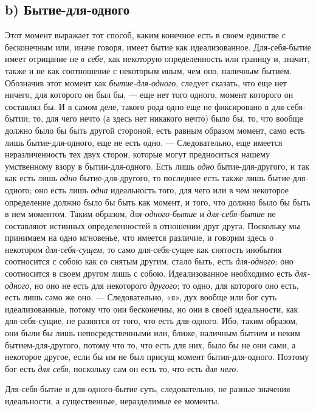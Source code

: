 \subsection*{b) Бытие-для-одного}
Этот момент выражает тот способ, каким конечное есть в своем единстве с
бесконечным или, иначе говоря, имеет бытие как идеализованное.
Для-себя-бытие имеет отрицание не {\em в себе}, как
некоторую определенность или границу и, значит, также и не как соотношение
с некоторым иным, чем оно, наличным бытием. Обозначив этот момент как
{\em бытие-для-одного}, следует сказать, что еще нет
ничего, для которого он был бы, — еще нет того одного, момент которого он
составлял бы. И в самом деле, такого рода одно еще не фиксировано в
для-себя-бытии; то, для чего нечто (а здесь нет никакого нечто) было бы,
то, что вообще должно было бы быть другой стороной, есть равным образом
момент, само есть лишь бытие-для-одного, еще не есть одно. — Следовательно,
еще имеется неразличенность тех двух сторон, которые могут предноситься
нашему умственному взору в бытии-для-одного. Есть лишь
{\em одно} бытие-для-другого, и так как есть лишь
{\em одно} бытие-для-другого, то последнее есть также
лишь бытие-для-одного; оно есть лишь {\em одна}
идеальность того, для чего или в чем некоторое определение должно было бы
быть как момент, и того, что должно было бы быть в нем моментом. Таким
образом, {\em для-одного-бытие} и
{\em для-себя-бытие} не составляют истинных
определенностей в отношении друг друга. Поскольку мы принимаем на одно
мгновенье, что имеется различие, и говорим здесь о некотором
{\em для-себя-сущем}, то само для-себя-сущее как
снятость инобытия соотносится с собою как со снятым другим, стало быть,
есть {\em для-одного}; оно соотносится в своем другом
лишь с собою. Идеализованное необходимо есть
{\em для-одного}, но оно не есть для некоторого
{\em другого}; то одно, для которого оно есть, есть
лишь само же оно. — Следовательно, «я», дух вообще или бог суть
идеализованные, потому что они бесконечны, но они в своей идеальности, как
для-себя-сущие, не разнятся от того, что есть для-одного. Ибо, таким
образом, они были бы лишь непосредственными или, ближе, наличным бытием и
неким бытием-для-другого, потому что то, что есть для них, было бы не они
сами, а некоторое другое, если бы им не был присущ момент бытия-для-одного.
Поэтому бог есть {\em для себя}, поскольку сам он есть
то, что есть {\em для него}.

Для-себя-бытие и для-одного-бытие суть, следовательно, не разные значения
идеальности, а существенные, неразделимые ее моменты.

